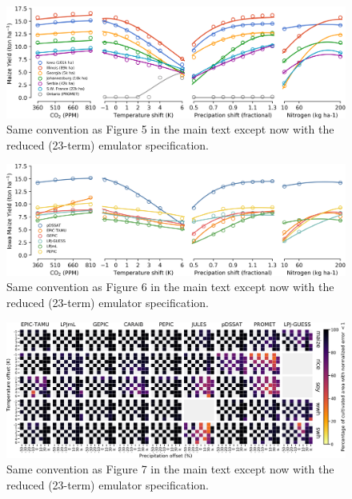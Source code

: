 \documentclass[10pt]{article}
\begin{document}
\begin{figure}[h!]
\centering
\includegraphics[width=15.5cm]{reduced_regression_example_1.png}
\caption{Same convention as Figure 5 in the main text except now with the reduced (23-term) emulator specification.}
\label{fig:reducedareas}
\end{figure}

\begin{figure}[h!]
\centering
\includegraphics[width=15.5cm]{reduced_regression_example_2.png}
\caption{Same convention as Figure 6 in the main text except now with the reduced (23-term) emulator specification.}
\label{fig:reducedmodels}
\end{figure}

\begin{figure}[h!]
\centering
\includegraphics[width=15.5cm]{reduced_error_grid.png}
\caption{Same convention as Figure 7 in the main text except now with the reduced (23-term) emulator specification.}
\label{fig:reducedgrid}
\end{figure}
\end{document}
